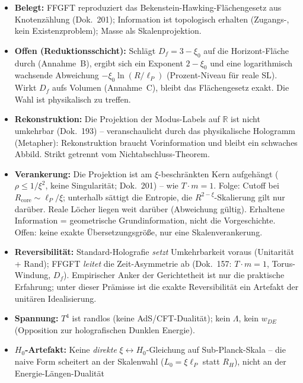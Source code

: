 \begin{itemize}
  \item \textbf{Belegt:} FFGFT reproduziert das Bekenstein-Hawking-Flächengesetz
        aus Knotenzählung (Dok.~201); Information ist topologisch erhalten
        (Zugangs-, kein Existenzproblem); Masse als Skalenprojektion.
  \item \textbf{Offen (Reduktionsschicht):} Schlägt $D_f = 3-\xi_0$ auf die
        Horizont-Fläche durch (Annahme~B), ergibt sich ein Exponent
        $2-\xi_0$ und eine logarithmisch wachsende Abweichung
        $-\xi_0\ln(R/\ell_P)$ (Prozent-Niveau für reale SL). Wirkt $D_f$
        aufs Volumen (Annahme~C), bleibt das Flächengesetz exakt. Die Wahl
        ist physikalisch zu treffen.
  \item \textbf{Rekonstruktion:} Die Projektion der Modus-Labels auf
        $\mathbb{R}$ ist nicht umkehrbar (Dok.~193) -- veranschaulicht durch
        das physikalische Hologramm (Metapher): Rekonstruktion braucht
        Vorinformation und bleibt ein schwaches Abbild. Strikt getrennt vom
        Nichtabschluss-Theorem.
  \item \textbf{Verankerung:} Die Projektion ist am $\xi$-beschränkten Kern
        aufgehängt ($\rho \le 1/\xi^2$, keine Singularität; Dok.~201) --
        wie $T\cdot m=1$. Folge: Cutoff bei $R_\text{core}\sim\ell_P/\xi$;
        unterhalb sättigt die Entropie, die $R^{2-\xi}$-Skalierung gilt nur
        darüber. Reale Löcher liegen weit darüber (Abweichung gültig). Erhaltene
        Information = geometrische Grundinformation, nicht die Vorgeschichte.
        Offen: keine exakte Übersetzungsgröße, nur eine Skalenverankerung.
  \item \textbf{Reversibilität:} Standard-Holografie \emph{setzt}
        Umkehrbarkeit voraus (Unitarität + Rand); FFGFT \emph{leitet} die
        Zeit-Asymmetrie ab (Dok.~157: $T\cdot m=1$, Torus-Windung, $D_f$).
        Empirischer Anker der Gerichtetheit ist nur die praktische Erfahrung;
        unter dieser Prämisse ist die exakte Reversibilität ein Artefakt der
        unitären Idealisierung.
  \item \textbf{Spannung:} $T^4$ ist randlos (keine AdS/CFT-Dualität); kein
        $\Lambda$, kein $w_{DE}$ (Opposition zur holografischen Dunklen Energie).
  \item \textbf{$H_0$-Artefakt:} Keine \emph{direkte} $\xi\leftrightarrow H_0$-Gleichung
        auf Sub-Planck-Skala -- die naive Form scheitert an der Skalenwahl
        ($L_0=\xi\ell_P$ statt $R_H$), nicht an der Energie-Längen-Dualität

\end{itemize}
